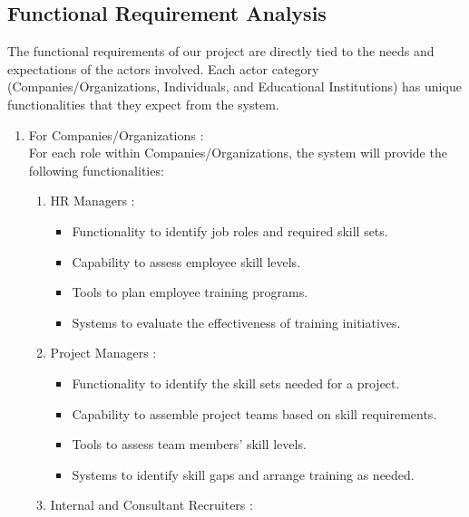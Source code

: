 \subsection{Functional Requirement Analysis}
The functional requirements of our project are directly tied to the needs and expectations of the actors involved. Each actor category (Companies/Organizations, Individuals, and Educational Institutions) has unique functionalities that they expect from the system.
\begin{enumerate}
    \item For Companies/Organizations : \\
          For each role within Companies/Organizations, the system will provide the following functionalities:
          \begin{enumerate}
              \item HR Managers : \\
                    \begin{itemize}
                        \renewcommand\labelitemi{-}
                        \item Functionality to identify job roles and required skill sets.
                        \item  Capability to assess employee skill levels.
                        \item Tools to plan employee training programs.
                        \item Systems to evaluate the effectiveness of training initiatives.
                    \end{itemize}
              \item Project Managers : \\
                    \begin{itemize}
                        \renewcommand\labelitemi{-}
                        \item Functionality to identify the skill sets needed for a project.
                        \item Capability to assemble project teams based on skill requirements.
                        \item Tools to assess team members' skill levels.
                        \item Systems to identify skill gaps and arrange training as needed.
                    \end{itemize}
              \item Internal and Consultant Recruiters : \\

\end{enumerate}
\end{enumerate}
